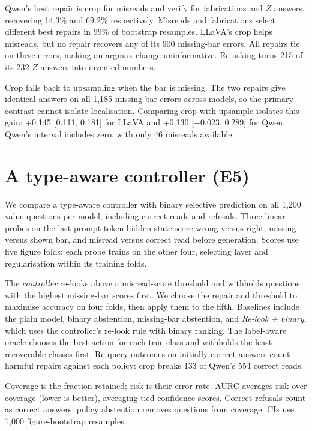 Qwen's best repair is crop for misreads and verify for fabrications and $Z$
answers, recovering 14.3\% and 69.2\% respectively. Misreads and fabrications
select different best repairs in 99\% of bootstrap resamples. LLaVA's crop
helps misreads, but no repair recovers any of its 600 missing-bar errors.
All repairs tie on these errors, making an argmax change uninformative.
Re-asking turns 215 of its 232 $Z$ answers into invented numbers.

Crop falls back to upsampling when the bar is missing. The two repairs give
identical answers on all 1,185 missing-bar errors across models, so the primary
contrast cannot isolate localisation. Comparing crop with upsample isolates
this gain: +0.145 [0.111, 0.181] for LLaVA and +0.130 [$-0.023$, 0.289] for
Qwen. Qwen's interval includes zero, with only 46 misreads available.

\section{A type-aware controller (E5)}
\label{sec:e5}

We compare a type-aware controller with binary selective prediction on all
1,200 value questions per model, including correct reads and refusals. Three
linear probes on the last prompt-token hidden state score wrong versus right,
missing versus shown bar, and misread versus correct read before generation.
Scores use five figure folds: each probe trains on the other four, selecting
layer and regularisation within its training folds.

The \emph{controller} re-looks above a misread-score threshold and withholds
questions with the highest missing-bar scores first. We choose the repair and
threshold to maximise accuracy on four folds, then apply them to the fifth.
Baselines include the plain model, binary abstention,
missing-bar abstention, and \emph{Re-look + binary}, which uses
the controller's re-look rule with binary ranking. The label-aware oracle
chooses the best action for each true class and withholds the least recoverable
classes first. Re-query outcomes on initially correct answers count harmful
repairs against each policy: crop breaks 133 of Qwen's 554 correct reads.

Coverage is the fraction retained; risk is their error rate. AURC averages
risk over coverage (lower is better), averaging tied confidence scores.
Correct refusals count as correct answers; policy abstention removes questions
from coverage. CIs use 1,000 figure-bootstrap resamples.

